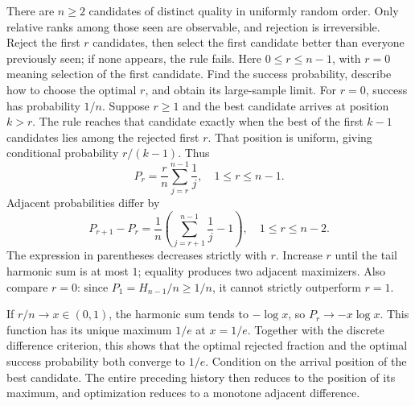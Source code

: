 There are $n\ge2$ candidates of distinct quality in uniformly random order. Only relative ranks among those seen are observable, and rejection is irreversible. Reject the first $r$ candidates, then select the first candidate better than everyone previously seen; if none appears, the rule fails. Here $0\le r\le n-1$, with $r=0$ meaning selection of the first candidate. Find the success probability, describe how to choose the optimal $r$, and obtain its large-sample limit.
\solution For $r=0$, success has probability $1/n$. Suppose $r\ge1$ and the best candidate arrives at position $k>r$. The rule reaches that candidate exactly when the best of the first $k-1$ candidates lies among the rejected first $r$. That position is uniform, giving conditional probability $r/(k-1)$. Thus
\[
\boxed{P_r=\frac rn\sum_{j=r}^{n-1}\frac1j,\quad1\le r\le n-1.}
\]
Adjacent probabilities differ by
\[
P_{r+1}-P_r=\frac1n\left(\sum_{j=r+1}^{n-1}\frac1j-1\right),
\quad1\le r\le n-2.
\]
The expression in parentheses decreases strictly with $r$. Increase $r$ until the tail harmonic sum is at most $1$; equality produces two adjacent maximizers. Also compare $r=0$: since $P_1=H_{n-1}/n\ge1/n$, it cannot strictly outperform $r=1$.

If $r/n\to x\in(0,1)$, the harmonic sum tends to $-\log x$, so $P_r\to-x\log x$. This function has its unique maximum $1/e$ at $x=1/e$. Together with the discrete difference criterion, this shows that the optimal rejected fraction and the optimal success probability both converge to $1/e$.
\insight Condition on the arrival position of the best candidate. The entire preceding history then reduces to the position of its maximum, and optimization reduces to a monotone adjacent difference.
